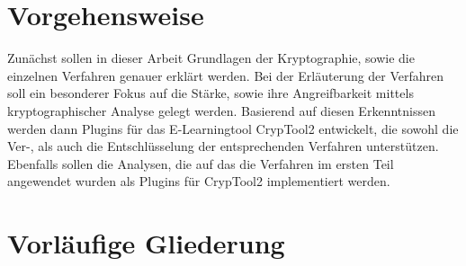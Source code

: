 \documentclass[fontsize=11pt, paper=a4, parskip=half]{scrartcl}
\begin{document}
\section{Vorgehensweise}
Zunächst sollen in dieser Arbeit Grundlagen der Kryptographie, sowie die einzelnen Verfahren genauer erklärt werden. Bei der Erläuterung der Verfahren soll ein besonderer Fokus auf die Stärke, sowie ihre Angreifbarkeit mittels kryptographischer Analyse gelegt werden. Basierend auf diesen Erkenntnissen werden dann Plugins für das E-Learningtool CrypTool2 entwickelt, die sowohl die Ver-, als auch die Entschlüsselung der entsprechenden Verfahren unterstützen. Ebenfalls sollen die Analysen, die auf das die Verfahren im ersten Teil angewendet wurden als Plugins für CrypTool2 implementiert werden. 

\newpage
\section{Vorläufige Gliederung}
\end{document}
